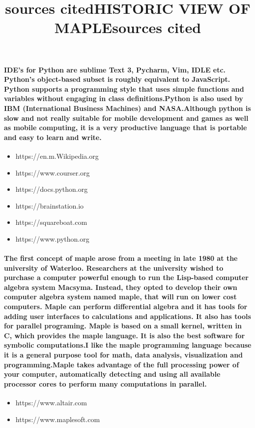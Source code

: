 \documentclass{article}
\begin{document}
\paragraph{IDE’s for Python are sublime Text 3, Pycharm, Vim, IDLE etc. Python’s object-based subset is roughly equivalent to JavaScript. Python supports a programming style that uses simple functions and variables without engaging in class definitions.Python is also used by IBM (International Business Machines) and NASA.Although python is slow and not really suitable for mobile development and games as well as mobile computing, it is a very productive language that is portable and easy to learn and write.}

\title{sources cited}
\begin{itemize}
\item https://en.m.Wikipedia.org
\item https://www.courser.org
\item https://docs.python.org
\item https://brainstation.io
\item https://squareboat.com
\item https://www.python.org
\end{itemize}

\title{HISTORIC VIEW OF MAPLE}
\paragraph{The first concept of maple arose from a meeting in late 1980 at the university of Waterloo. Researchers at the university wished to purchase a computer powerful enough to run the Lisp-based computer algebra system Macsyma. Instead, they opted to develop their own computer algebra system named maple, that will run on lower cost computers. Maple can perform differential algebra and it has tools for adding user interfaces to calculations and applications. It also has tools for parallel programing. Maple is based on a small kernel, written in C, which provides the maple language. It is also the best software for symbolic computations.I like the maple programming language because it is a general purpose tool for math, data analysis, visualization and programming.Maple takes advantage of the full processing power of your computer, automatically detecting and using all available processor cores to perform many computations in parallel.}

\title{sources cited}
\begin{itemize}
	\item https://www.altair.com
	\item https://www.maplesoft.com
\end{itemize}
	
\end{document}
